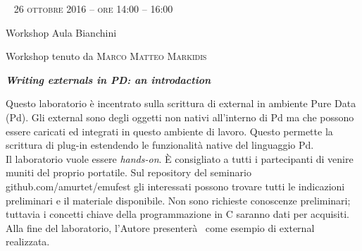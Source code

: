 \clearpage

\begin{flushleft}

~\vfill
\large{
	\scshape{
	26 ottobre 2016 -- ore 14:00 -- 16:00
	}}

\medskip
	
\small{Workshop
	\newline Aula Bianchini}

\medskip

{\fontsize{42}{42} }

\normalfont

\normalsize


\bigskip

Workshop tenuto da \textsc{Marco Matteo Markidis}

\bigskip

\textbf{\emph{Writing externals in PD: an introdaction}}

Questo laboratorio \`e incentrato sulla scrittura di external in ambiente Pure Data (Pd). Gli external sono degli oggetti non nativi all'interno di Pd ma che possono essere caricati ed integrati in questo ambiente di lavoro. Questo permette la scrittura di plug-in estendendo le funzionalit\`a native del linguaggio Pd. \\
Il laboratorio vuole essere \emph{hands-on}. \`E consigliato a tutti i partecipanti di venire muniti del proprio portatile. Sul repository del seminario github.com/amurtet/emufest gli interessati possono trovare tutti le indicazioni preliminari e il materiale disponibile. Non sono richieste conoscenze preliminari; tuttavia i concetti chiave della programmazione in C saranno dati per acquisiti. \\
Alla fine del laboratorio, l'Autore presenter\`a \pa ~come esempio di external realizzata. \\

\end{flushleft}
